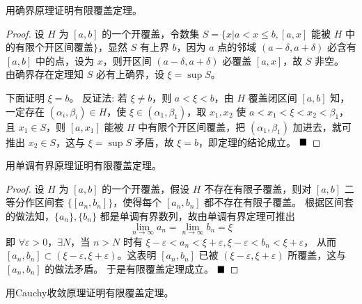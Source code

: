 \begin{problem}
    用确界原理证明有限覆盖定理。
\end{problem}

\begin{proof}
    设 $H$ 为 $[a,b]$ 的一个开覆盖，令数集 $S = \{x | a < x \leq b, [a,x]$ 能被 $H$ 中的有限个开区间覆盖$\}$，显然 $S$ 有上界 $b$，因为 $a$ 点的邻域 $(a - \delta, a + \delta)$ 必含有 $[a,b]$ 中的点，设为 $x$，则开区间 $(a - \delta, a + \delta)$ 必覆盖 $[a,x]$，故 $S$ 非空。
    由确界存在定理知 $S$ 必有上确界，设 $\xi = \sup S$。
    
    下面证明 $\xi = b$。
    反证法: 若 $\xi \neq b$，则 $a < \xi < b$，由 $H$ 覆盖闭区间 $[a,b]$ 知，一定存在 $(\alpha_i, \beta_i) \in H$，使 $\xi \in (\alpha_1, \beta_1)$，取 $x_1, x_2$ 使 $a < x_1 < \xi < x_2 < \beta_1$，且 $x_1 \in S$，则 $[a,x_1]$ 能被 $H$ 中有限个开区间覆盖，把 $(\alpha_1, \beta_1)$ 加进去，就可推出 $x_2 \in S$，这与 $\xi = \sup S$ 矛盾，故 $\xi = b$，即定理的结论成立。
    $\hfill \blacksquare$
\end{proof}


\begin{problem}
    用单调有界原理证明有限覆盖定理。
\end{problem}

\begin{proof}
    设 $H$ 为 $[a,b]$ 的一个开覆盖，假设 $H$ 不存在有限子覆盖，则对 $[a,b]$ 二等分作区间套 $\{[a_n, b_n]\}$，使得每个 $[a_n, b_n]$ 都不存在有限子覆盖。
    根据区间套的做法知，$\{a_n\}, \{b_n\}$ 都是单调有界数列，故由单调有界定理可推出
    \[
    \lim\limits_{n \to \infty} a_n = \lim\limits_{n \to \infty} b_n = \xi
    \]
    即 $\forall \varepsilon > 0$，$\exists N$，当 $n > N$ 时有 $\xi - \varepsilon < a_n < \xi + \varepsilon, \xi - \varepsilon < b_n < \xi + \varepsilon$，
    从而 $[a_n, b_n] \subset (\xi - \varepsilon, \xi + \varepsilon)$。这表明 $[a_n, b_n]$ 已被 $(\xi - \varepsilon, \xi + \varepsilon)$ 所覆盖，这与 $[a_n, b_n]$ 的做法矛盾。
    于是有限覆盖定理成立。
    $\hfill \blacksquare$
    \end{proof}

\begin{problem}
    用Cauchy收敛原理证明有限覆盖定理。
\end{problem}

